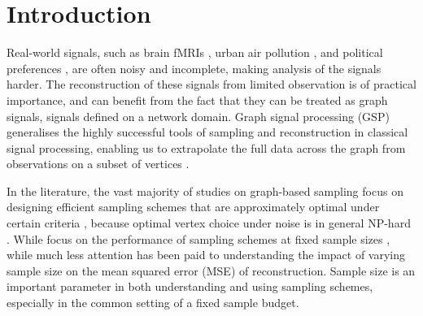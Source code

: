 \section{Introduction}
Real-world signals, such as brain fMRIs \cite{itani2021graph}, urban air pollution \cite{jain2014big}, and political preferences \cite{renoust2017estimating}, are often noisy and incomplete, making analysis of the signals harder. The reconstruction of these signals from limited observation is of practical importance, and can benefit from the fact that they can be treated as graph signals,  signals defined on a network domain. 
Graph signal processing (GSP) generalises the highly successful tools of sampling and reconstruction in classical signal processing, enabling us to extrapolate the full data across the graph from observations on a subset of vertices \cite{tanaka2020sampling}. %

In the literature, the vast majority of studies on graph-based sampling focus on designing efficient sampling schemes that are approximately optimal under certain criteria \cite[Chapter 6]{pukelsheim2006optimal}, because optimal vertex choice under noise is in general NP-hard \cite{nikolov2022proportional, chamon2017greedy}. While  focus on the performance of sampling schemes at fixed sample sizes \cite{xie2019bayesian, puy2018random,shomorony2014sampling, tremblay2017determinantal,wang2018optimal,wang2019low, bai2020fast,  anis2016efficient}, while much less attention has been paid to understanding the impact of varying sample size on the mean squared error (MSE) of reconstruction. Sample size is an important parameter in both understanding and using sampling schemes, especially in the common setting of a fixed sample budget. %


